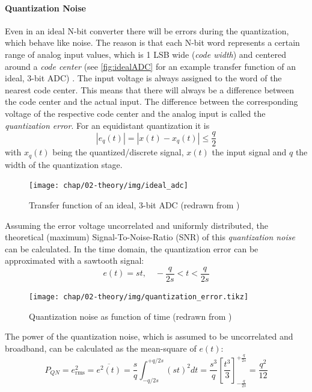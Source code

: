 \paragraph{Quantization Noise}
Even in an ideal N-bit converter there will be errors during the quantization, which behave like noise. The reason is that each N-bit word represents a certain range of analog input values, which is 1 LSB wide (\textit{code width}) and centered around a \textit{code center} (see \autoref{fig:idealADC} for an example transfer function of an ideal, 3-bit ADC) \cite{Lundberg}. The input voltage is always assigned to the word of the nearest code center. This means that there will always be a difference between the code center and the actual input. The difference between the corresponding voltage of the respective code center and the analog input is called the \textit{quantization error}. For an equidistant quantization it is
\begin{equation}
	\left| e_q(t) \right| = \left| x(t) - x_q(t) \right| \leq \frac{q}{2}
\end{equation}
with $x_q(t)$ being the quantized/discrete signal, $x(t)$ the input signal and $q$ the width of the quantization stage. \cite{puente2015} 

\begin{figure}[H]
	\centering
	\texttt{[image: chap/02-theory/img/ideal\_adc]}
	\caption{Transfer function of an ideal, 3-bit ADC (redrawn from \cite{Lundberg})}
	\label{fig:idealADC}
\end{figure}
Assuming the error voltage uncorrelated and uniformly distributed, the theoretical (maximum) Signal-To-Noise-Ratio (SNR) of this \textit{quantization noise} can be calculated. In the time domain, the quantization error can be approximated with a sawtooth signal:
\begin{equation}
	e(t) = st, \quad -\frac{q}{2s} < t < \frac{q}{2s} 
\end{equation}
\begin{figure}[H]
	\centering
	\texttt{[image: chap/02-theory/img/quantization\_error.tikz]}
	\caption{Quantization noise as function of time (redrawn from \cite{walt})}
	\label{fig:eq}
\end{figure}

The power of the quantization noise, which is assumed to be uncorrelated and broadband, can be calculated as the mean-square of $e(t)$:
\begin{equation}
	P_{QN} = e_{\text{rms}}^{2} = \overline{e^{2}(t)} = \frac{s}{q}\int_{-q/2s}^{+q/2s} (st)^{2} dt = \frac{s^3}{q} \left[ \frac{t^3}{3}\right]_{-\frac{q}{2s}}^{+\frac{q}{2s}} = \frac{q^2}{12}
\end{equation}


